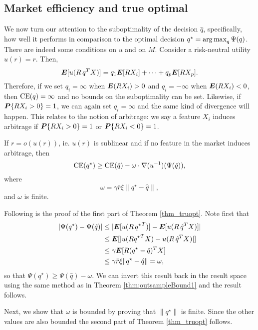 \subsection{Market efficiency and true optimal}
\newcommand{\EU}{{\bf EU}}
We now turn our attention to the suboptimality of the decision $\hat q$, specifically,
how well it performs in comparison to the optimal decision $q^\star =
\operatorname*{arg\,max}_q\Psi(q)$. There are indeed some conditions on $u$ and on $M$. Consider a
risk-neutral utility $u(r)=r$. Then,
\[
  \bm E[u(R\,q^TX)] = q_1\bm E[RX_i]+\cdots+q_p\bm E[RX_p].
\]
Therefore, if we set $q_i = \infty$ when $\bm E(RX_i)>0$ and $q_i=-\infty$ when $\bm E(RX_i)<0$,
then $\operatorname{CE}(q)=\infty$ and no bounds on the suboptimality can be set. Likewise, if
$\bm P\{RX_i>0\}=1$, we can again set $q_i=\infty$ and the same kind of divergence will
happen. This relates to the notion of arbitrage: we say a feature $X_i$ induces arbitrage
if $\bm P\{RX_i>0\}=1$ or $\bm P\{RX_i<0\}=1$.

\begin{thm}
  \label{thm_truopt}
  If $r=o(u(r))$, ie. $u(r)$ is sublinear and if no feature in the market induces
  arbitrage, then 
  \[
    \operatorname{CE}(q^\star) \geq \operatorname{CE}(\hat q) - \omega\cdot\nabla(u^{-1})(\Psi(\hat q)),
  \]
  where
  \[
    \omega = \gamma\bar r\xi\|q^\star - \hat q\|,
  \]
  and $\omega$ is finite. 
\end{thm}

Following is the proof of the first part of Theorem \ref{thm_truopt}. Note first that 
\begin{align*}
  |\Psi(q^\star)-\Psi(\hat q)| &\leq |\bm E[u(R\,{q^\star}^T)] - \bm E[u(R\,\hat q^TX)]|\\
                             &\leq \bm E[|u(R{q^\star}^TX) - u(R\,\hat q^TX)|]\\
                             &\leq \gamma \bm E[R({q^\star}-\hat q)^TX]\\
                             &\leq \gamma\bar r\xi\|q^\star - \hat q\|=\omega,
\end{align*}
so that $\Psi(q^\star) \geq \Psi(\hat q) - \omega$. We can invert this result back in the
result space using the same method as in Theorem \ref{thm:outsampleBound1} and the result
follows.

Next, we show that $\omega$ is bounded by proving that $\|q^\star\|$ is finite. Since the
other values are also bounded the second part of Theorem \ref{thm_truopt} follows. 

